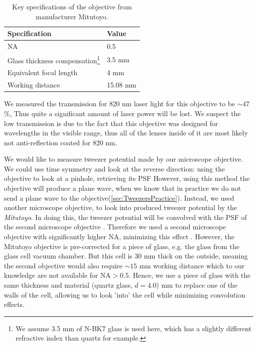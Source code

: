 \begin{table}[h]
	\centering
	\caption{Key specifications of the objective from manufacturer Mitutoyo.}
	\label{table:MitutoyoSpecs}
	\begin{tabular}{l | l}
		\textbf{Specification}       & \textbf{Value} \\ \hline 
		NA                           & 0.5            \\ \hline
		Glass thickness compensation\footnote{We assume 3.5 mm of N-BK7 glass is used here, which has a slightly different refractive index than quartz for example.} & 3.5 mm         \\ \hline
		Equivalent focal length      & 4 mm           \\ \hline
		Working distance             & 15.08 mm      
	\end{tabular}
\end{table}
\noindent We measured the transmission for 820 nm laser light for this objective to be $\sim 47$\%, 
Thus quite a significant amount of laser power will be lost. 
We suspect the low transmission is due to the fact that this objective was designed for wavelengths in the visible range, thus all of the lenses inside of it are most likely not anti-reflection coated for 820 nm.

We would like to measure tweezer potential made by our microscope objective. 
We could use time symmetry and look at the reverse direction: using the objective to look at a pinhole, retrieving its \acf{PSF} \cite{Knottnerus2018,Sortais2007}
However, using this method the objective will produce a plane wave, when we know that in practice we do not send a plane wave to the objective(\cref{sec:TweezersPractice}). 
Instead, we used another microscope objective, to look into produced tweezer potential by the \textit{Mitutoyo}. 
In doing this, the tweezer potential will be convolved with the \ac{PSF} of the second microscope objective \cite{Baumgaertner2017}.
Therefore we used a second microscope objective with significantly higher \ac{NA}, minimizing this effect \cite{Baumgaertner2017}. 
However, the Mitutoyo objective is pre-corrected for a piece of glass, e.g. the glass from the glass cell vacuum chamber. 
But this cell is 30 mm thick on the outside, meaning the second objective would also require $\sim 15$ mm working distance which to our knowledge are not available for $\text{NA}>0.5$.
Hence, we use a piece of glass with the same thickness and material (quartz glass, $d = 4.0$) mm to replace one of the walls of the cell, allowing us to look 'into' the cell while minimizing convolution effects.

